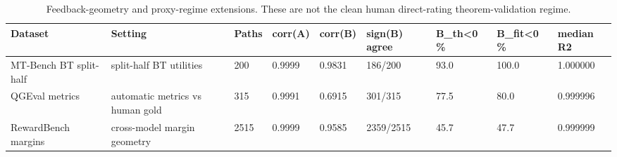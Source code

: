 \begin{table}[t]
\centering
\small
\begin{tabular}{lllllllll}
\toprule
Dataset & Setting & Paths & corr(A) & corr(B) & sign(B) agree & B\_th<0 \% & B\_fit<0 \% & median R2 \\
\midrule
MT-Bench BT split-half & split-half BT utilities & 200 & 0.9999 & 0.9831 & 186/200 & 93.0 & 100.0 & 1.000000 \\
QGEval metrics & automatic metrics vs human gold & 315 & 0.9991 & 0.6915 & 301/315 & 77.5 & 80.0 & 0.999996 \\
RewardBench margins & cross-model margin geometry & 2515 & 0.9999 & 0.9585 & 2359/2515 & 45.7 & 47.7 & 0.999999 \\
\bottomrule
\end{tabular}
\vspace{0.25em}
\caption{Feedback-geometry and proxy-regime extensions. These are not the clean human direct-rating theorem-validation regime.}
\label{tab:feedback-extensions}
\end{table}

